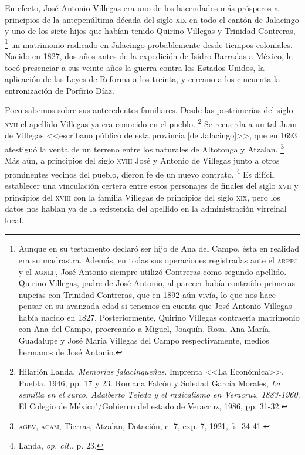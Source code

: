 \documentclass[14pt,twoside,final]{extbook} %
\let\oldfootnote\footnote
\renewcommand\footnote[1]{%
\oldfootnote{\hspace{1mm}#1}}
\begin{document}
En efecto, José Antonio Villegas era uno de los hacendados más prósperos a principios de la antepenúltima década del siglo \textsc{xix} en todo el cantón de Jalacingo y uno de los siete hijos que habían tenido Quirino Villegas y Trinidad Contreras,\footnote{Aunque en su testamento declaró ser hijo de Ana del Campo, ésta en realidad era su madrastra. Además, en todas sus operaciones registradas ante el \textsc{arppj} y el \textsc{agnep}, José Antonio siempre utilizó Contreras como segundo apellido. Quirino Villegas, padre de José Antonio, al parecer había contraído primeras nupcias con Trinidad Contreras, que en 1892 aún vivía, lo que nos hace pensar en su avanzada edad si tenemos en cuenta que José Antonio Villegas había nacido en 1827. Posteriormente, Quirino Villegas contraería matrimonio con Ana del Campo, procreando a Miguel, Joaquín, Rosa, Ana María, Guadalupe y José María Villegas del Campo respectivamente, medios hermanos de José Antonio.} un matrimonio radicado en Jalacingo probablemente desde tiempos coloniales. Nacido en 1827, dos años antes de la expedición de Isidro Barradas a México, le tocó presenciar a sus veinte años la guerra contra los Estados Unidos, la aplicación de las Leyes de Reforma a los treinta, y cercano a los cincuenta la entronización de Porfirio Díaz.

Poco sabemos sobre sus antecedentes familiares. Desde las postrimerías del siglo \textsc{xvii} el apellido Villegas ya era conocido en el pueblo.\footnote{Hilarión Landa, \emph{Memorias jalacingueñas}. Imprenta <<La Económica>>, Puebla, 1946, pp. 17 y 23. Romana Falcón y Soledad García Morales, \emph{La semilla en el surco. Adalberto Tejeda y el radicalismo en Veracruz, 1883-1960}. El Colegio de México"/Gobierno del estado de Veracruz, 1986, pp. 31-32.} Se recuerda a un tal Juan de Villegas <<escribano público de esta provincia [de Jalacingo]>>, que en 1693 atestiguó la venta de un terreno entre los naturales de Altotonga y Atzalan.\footnote{\textsc{agev, acam}, Tierras, Atzalan, Dotación, c. 7, exp. 7, 1921, fs. 34-41.} Más aún, a principios del siglo \textsc{xviii} José y Antonio de Villegas junto a otros prominentes vecinos del pueblo, dieron fe de un nuevo contrato.\footnote{Landa, \emph{op. cit.}, p. 23.} Es difícil establecer una vinculación certera entre estos personajes de finales del siglo \textsc{xvii} y principios del \textsc{xviii} con la familia Villegas de principios del siglo \textsc{xix}, pero los datos nos hablan ya de la existencia del apellido en la administración virreinal local.
\end{document}
